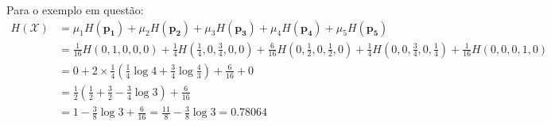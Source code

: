 \begin{example}
Para o exemplo em questão:
\begin{subequations}
\begin{align}
  H(\mathcal{X}) &= \mu_1 H(\mathbf{p_1}) + \mu_2 H(\mathbf{p_2}) + \mu_3 H(\mathbf{p_3}) + \mu_4 H(\mathbf{p_4}) + \mu_5 H(\mathbf{p_5}) \\
        &= \frac{1}{16} H(0,1,0,0,0) + \frac{1}{4} H(\frac{1}{4}, 0, \frac{3}{4}, 0, 0) + \frac{6}{16} H(0, \frac{1}{2}, 0, \frac{1}{2}, 0) +
                \frac{1}{4} H(0, 0, \frac{3}{4}, 0, \frac{1}{4}) + \frac{1}{16} H(0, 0, 0, 1, 0) \\
        &= 0 + 2 \times \frac{1}{4} \left( \frac{1}{4} \log 4 + \frac{3}{4} \log \frac{4}{3} \right) +
                \frac{6}{16} + 0 \\
        &= \frac{1}{2} \left( \frac{1}{2} + \frac{3}{2} - \frac{3}{4} \log 3  \right) + \frac{6}{16} \\
        &= 1 - \frac{3}{8} \log 3 + \frac{6}{16} = \frac{11}{8} - \frac{3}{8} \log 3 = 0.78064
\end{align}
\end{subequations}

\end{example}
